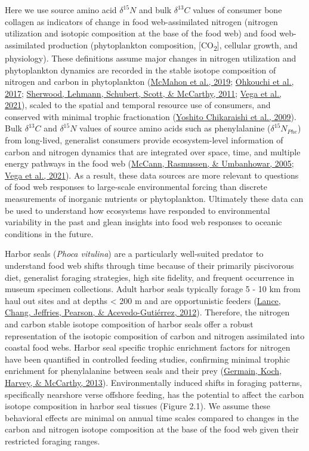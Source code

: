 \documentclass [11pt, proquest] {uwthesis}[2015/03/03]
\begin{document}
Here we use source amino acid \(\delta^{15}N\) and bulk \(\delta^{13}C\) values of consumer bone collagen as indicators of change in food web-assimilated nitrogen (nitrogen utilization and isotopic composition at the base of the food web) and food web-assimilated production (phytoplankton composition, {[}CO\textsubscript{2}{]}, cellular growth, and physiology). These definitions assume major changes in nitrogen utilization and phytoplankton dynamics are recorded in the stable isotope composition of nitrogen and carbon in phytoplankton (\protect\hyperlink{ref-McMahon2019}{McMahon et al., 2019}; \protect\hyperlink{ref-Ohkouchi2017}{Ohkouchi et al., 2017}; \protect\hyperlink{ref-Sherwood2011}{Sherwood, Lehmann, Schubert, Scott, \& McCarthy, 2011}; \protect\hyperlink{ref-delaVega2021}{Vega et al., 2021}), scaled to the spatial and temporal resource use of consumers, and conserved with minimal trophic fractionation (\protect\hyperlink{ref-Chikaraishi2009}{Yoshito Chikaraishi et al., 2009}). Bulk \(\delta^{13}C\) and \(\delta^{15}N\) values of source amino acids such as phenylalanine (\(\delta^{15}N_{Phe}\)) from long-lived, generalist consumers provide ecosystem-level information of carbon and nitrogen dynamics that are integrated over space, time, and multiple energy pathways in the food web (\protect\hyperlink{ref-McCann2005}{McCann, Rasmussen, \& Umbanhowar, 2005}; \protect\hyperlink{ref-delaVega2021}{Vega et al., 2021}). As a result, these data sources are more relevant to questions of food web responses to large-scale environmental forcing than discrete measurements of inorganic nutrients or phytoplankton. Ultimately these data can be used to understand how ecosystems have responded to environmental variability in the past and glean insights into food web responses to oceanic conditions in the future.

Harbor seals (\emph{Phoca vitulina}) are a particularly well-suited predator to understand food web shifts through time because of their primarily piscivorous diet, generalist foraging strategies, high site fidelity, and frequent occurrence in museum specimen collections. Adult harbor seals typically forage 5 - 10 km from haul out sites and at depths \textless{} 200 m and are opportunistic feeders (\protect\hyperlink{ref-Lance2012}{Lance, Chang, Jeffries, Pearson, \& Acevedo-Gutiérrez, 2012}). Therefore, the nitrogen and carbon stable isotope composition of harbor seals offer a robust representation of the isotopic composition of carbon and nitrogen assimilated into coastal food webs. Harbor seal specific trophic enrichment factors for nitrogen have been quantified in controlled feeding studies, confirming minimal trophic enrichment for phenylalanine between seals and their prey (\protect\hyperlink{ref-Germain2013}{Germain, Koch, Harvey, \& McCarthy, 2013}). Environmentally induced shifts in foraging patterns, specifically nearshore verse offshore feeding, has the potential to affect the carbon isotope composition in harbor seal tissues (Figure 2.1). We assume these behavioral effects are minimal on annual time scales compared to changes in the carbon and nitrogen isotope composition at the base of the food web given their restricted foraging ranges.
\end{document}
